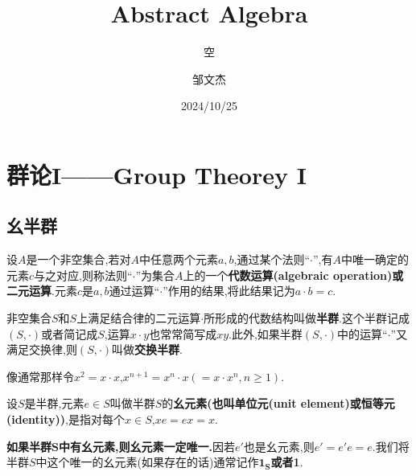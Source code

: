 \documentclass[lang=cn,newtx,10pt,scheme=chinese]{../Template/elegantbook}
\title{Abstract Algebra}
\subtitle{空}
\author{邹文杰}
\institute{无}
\date{2024/10/25}
\begin{document}
\maketitle

\frontmatter

\tableofcontents

\mainmatter
\everymath{\displaystyle} %

\chapter{群论I——Group Theorey I}

\section{幺半群}

\begin{definition}\label{definition:代数运算/二元运算定义}
设\(A\)是一个非空集合,若对\(A\)中任意两个元素\(a,b\),通过某个法则“\(\cdot\)”,有\(A\)中唯一确定的元素\(c\)与之对应,则称法则“\(\cdot\)”为集合\(A\)上的一个\textbf{代数运算(algebraic operation)或二元运算}.元素\(c\)是\(a,b\)通过运算“\(\cdot\)”作用的结果,将此结果记为\(a \cdot b = c\).
\end{definition}

\begin{definition}[(交换)半群定义]\label{definition:(交换)半群定义}
非空集合\(S\)和\(S\)上满足结合律的二元运算\(\cdot\)所形成的代数结构叫做\textbf{半群}.这个半群记成\((S,\cdot)\)或者简记成\(S\),运算\(x\cdot y\)也常常简写成\(xy\).此外,如果半群\((S,\cdot)\)中的运算“$\cdot$”又满足交换律,则\((S,\cdot)\)叫做\textbf{交换半群}.
\end{definition}
\begin{remark}
像通常那样令\(x^2 = x\cdot x\),\(x^{n + 1} = x^n\cdot x( = x\cdot x^n, n\geq1)\).
\end{remark}

\begin{definition}[幺元素定义]\label{definition:幺元素定义}
设\(S\)是半群,元素\(e\in S\)叫做半群\(S\)的\textbf{幺元素(也叫单位元(unit element)或恒等元(identity))},是指对每个\(x\in S\),\(xe = ex = x\).
\end{definition}
\begin{note}
\textbf{如果半群$\boldsymbol{S}$中有幺元素,则幺元素一定唯一.}因若$e'$也是幺元素,则$e'=e'e=e$.我们将半群$S$中这个唯一的幺元素(如果存在的话)通常记作$\boldsymbol{1_S}$\textbf{或者1}.
\end{note}
\end{document}
